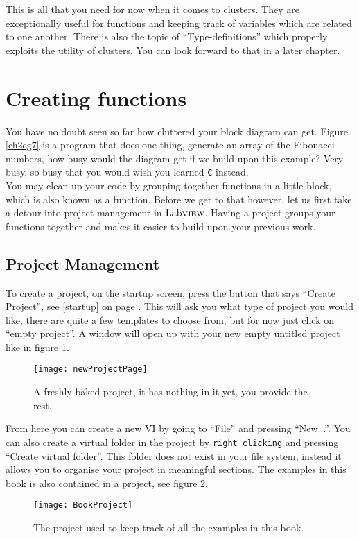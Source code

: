 This is all that you need for now when it comes to clusters. They are exceptionally useful for functions and keeping track of variables which are related to one another. There is also the topic of ``Type-definitions'' which properly exploits the utility of clusters. You can look forward to that in a later chapter.
\section{Creating functions}
You have no doubt seen so far how cluttered your block diagram can get. Figure \ref{ch2eg7} is a program that does one thing, generate an array of the Fibonacci numbers, how busy would the diagram get if we build upon this example? Very busy, so busy that you would wish you learned \texttt{C} instead.\\

You may clean up your code by grouping together functions in a little block, which is also known as a function. Before we get to that however, let us first take a detour into project management in $\text{Lab}\textsc{view}$. Having a project groups your functions together and makes it easier to build upon your previous work.\\

\subsection{Project Management}
To create a project, on the startup screen, press the button that says ``Create Project'', see \ref{startup} on page \pageref{startup}. This will ask you what type of project you would like, there are quite a few templates to choose from, but for now just click on ``empty project''. A window will open up with your new empty untitled project like in figure \ref{newProjectPage}.\\
\begin{figure}
	\centering
	\texttt{[image: newProjectPage]}
	\caption{A freshly baked project, it has nothing in it yet, you provide the rest.}
	\label{newProjectPage}
\end{figure}

From here you can create a new VI by going to ``File'' and pressing ``New...''. You can also create a virtual folder in the project by \texttt{right clicking} and pressing ``Create virtual folder''. This folder does not exist in your file system, instead it allows you to organise your project in meaningful sections. The examples in this book is also contained in a project, see figure \ref{BookProject}.\\
\begin{figure}
	\centering
	\texttt{[image: BookProject]}
	\caption{The project used to keep track of all the examples in this book.}
	\label{BookProject}
\end{figure}

